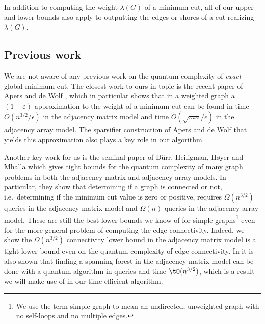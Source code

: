 In addition to computing the weight $\lambda(G)$ of a minimum cut, all of our upper and lower bounds also apply to outputting the edges or shores of a cut realizing $\lambda(G)$.


\subsection{Previous work}
We are not aware of any previous work on the quantum complexity of \emph{exact} global minimum cut.  The closest work to ours in topic is the recent paper of Apers and de Wolf \cite{AdW19}, which 
in particular shows that in a weighted graph a $(1+\varepsilon)$-approximation to the weight of a minimum cut can be found in time $\tilde O(n^{3/2}/\epsilon)$ in the adjacency matrix model and time 
$\tilde O(\sqrt{mn}/\epsilon)$ in the adjacency array model.  The sparsifier construction of Apers and de Wolf that yields this approximation also plays a key role in our algorithm.  

Another key work for us is the seminal paper of D\"{u}rr, Heiligman, H{\o}yer and Mhalla \cite{DHHM06} which gives tight bounds for the quantum complexity of many graph problems in both the adjacency matrix and adjacency array models.  In particular, 
they show that determining if a graph is connected or not, i.e.\ determining if the minimum cut value is zero or positive, requires $\Omega(n^{3/2})$ queries in the adjacency matrix 
model and $\Omega(n)$ queries in the adjacency array model.  These are still the best lower bounds we know of for simple graphs\footnote{We use the term simple graph to mean an undirected, unweighted 
graph with no self-loops and no multiple edges.} even for the more general problem of computing the edge connectivity. Indeed, 
we show the $\Omega(n^{3/2})$ connectivity lower bound in the adjacency matrix model is a tight lower bound even on the quantum complexity of edge connectivity.
In \cite{DHHM06} it is also shown that finding a spanning forest in the adjacency matrix model can be done with a quantum algorithm in queries and time $\tO(n^{3/2})$, which is a result we will make use of in our time efficient algorithm.

